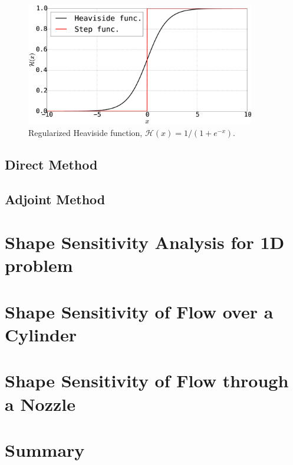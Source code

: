 \begin{figure}[H]
	\centering
	\includegraphics[width=10.00cm]{Chapter_4/figure/heaviside_function_example.eps}
	\caption{Regularized Heaviside function, $\mathcal{H}(x) = 1 / (1 + e^{-x})$.}
	\label{fig:C4_heavisideFunctionExample}
\end{figure}



\subsection{Direct Method}

\subsection{Adjoint Method}

\section{Shape Sensitivity Analysis for 1D problem}

\section{Shape Sensitivity of Flow over a Cylinder}

\section{Shape Sensitivity of Flow through a Nozzle}

\section{Summary}
